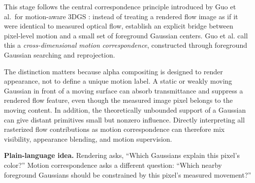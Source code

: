 \documentclass[10pt]{article}
\newcommand{\plainidea}[1]{%
  \vspace{0.25em}
  \noindent\colorbox{SoftGray}{%
    \parbox{\dimexpr\linewidth-2\fboxsep\relax}{%
      \textbf{Plain-language idea.} #1}}
  \vspace{0.25em}
}
\begin{document}
This stage follows the central correspondence principle introduced by Guo
et al.\ for motion-aware 3DGS \cite{guo2024motionaware}: instead of treating a
rendered flow image as if it were identical to measured optical flow, establish
an explicit bridge between pixel-level motion and a small set of foreground
Gaussian centers. Guo et al. call this a \emph{cross-dimensional motion
correspondence}, constructed through foreground Gaussian searching and
reprojection.

The distinction matters because alpha compositing is designed to render
appearance, not to define a unique motion label. A static or weakly moving
Gaussian in front of a moving surface can absorb transmittance and suppress a
rendered flow feature, even though the measured image pixel belongs to the
moving content. In addition, the theoretically unbounded support of a Gaussian
can give distant primitives small but nonzero influence. Directly interpreting
all rasterized flow contributions as motion correspondence can therefore mix
visibility, appearance blending, and motion supervision.

\plainidea{Rendering asks, ``Which Gaussians explain this pixel's color?''
Motion correspondence asks a different question: ``Which nearby foreground
Gaussians should be constrained by this pixel's measured movement?''}
\end{document}
